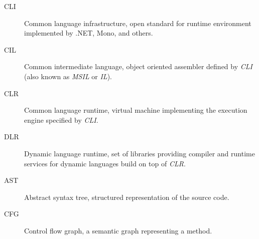 
\begin{description}
	
	\item[CLI] Common language infrastructure, open standard for runtime environment implemented by .NET, Mono, and others.
	
	\item[CIL] Common intermediate language, object oriented assembler defined by \emph{CLI} (also known as \emph{MSIL} or \emph{IL}).
	
	\item[CLR] Common language runtime, virtual machine implementing the execution engine specified by \emph{CLI}.
	
	\item[DLR] Dynamic language runtime, set of libraries providing compiler and runtime services for dynamic languages build on top of \emph{CLR}.
	
	\item[AST] Abstract syntax tree, structured representation of the source code.
	
	\item[CFG] Control flow graph, a semantic graph representing a method.
	
\end{description}


